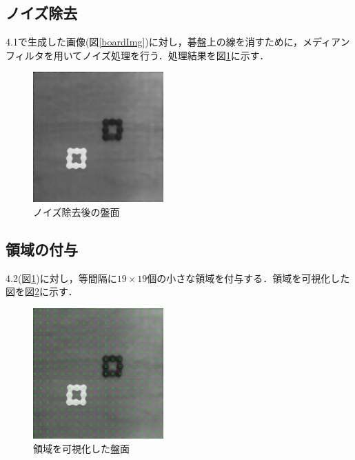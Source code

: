 \documentclass[openright]{nitocs}
\numberwithin{equation}{section}
\begin{document}
        \subsection{ノイズ除去}
            4.1で生成した画像(図\ref{boardImg})に対し，碁盤上の線を消すために，メディアンフィルタを用いてノイズ処理を行う．処理結果を図\ref{noiseReduced}に示す．
            \begin{figure}[tb] %
                \begin{center}
                \includegraphics[width=50mm,height=50mm]{noiseReducedImg.jpg} 
                \caption{ノイズ除去後の盤面}
                \label{noiseReduced}
                \end{center}
            \end{figure}

        \subsection{領域の付与}
            \label{area}
            4.2(図\ref{noiseReduced})に対し，等間隔に$19\times19$個の小さな領域を付与する．領域を可視化した図を図\ref{boardWithArea}に示す．
            \begin{figure}[tb] %
                \begin{center}
                \includegraphics[width=50mm,height=50mm]{boardWithAreaImg.jpg} 
                \caption{領域を可視化した盤面}
                \label{boardWithArea}
                \end{center}
            \end{figure}
\end{document}
